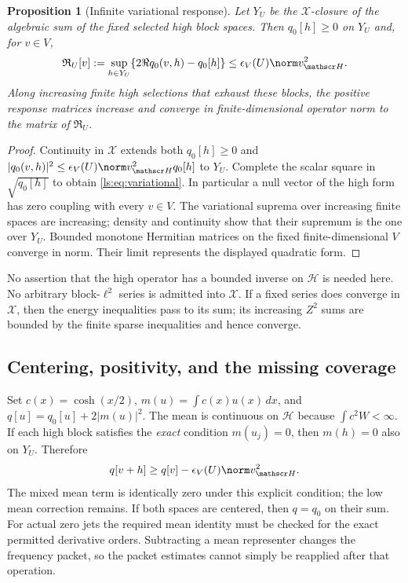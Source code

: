 \documentclass[11pt,a4paper]{article}
\numberwithin{equation}{section}
\newtheorem{proposition}[theorem]{Proposition}
\theoremstyle{definition}\newtheorem{definition}[theorem]{Definition}
\theoremstyle{remark}\newtheorem{remark}[theorem]{Remark}
\begin{document}
\begin{proposition}[Infinite variational response]\label{ls:prop:infinite}
Let $Y_U$ be the $\mathscr X$-closure of the algebraic sum of the fixed selected
high block spaces. Then $q_0[h]\ge0$ on $Y_U$ and, for $v\in V$,
\begin{equation}\label{ls:eq:variational}
 \mathfrak R_U[v]:=\sup_{h\in Y_U}
 \{2\Re q_0(v,h)-q_0[h]\}
 \le\epsilon_V(U)\norm v_{\mathscr H}^2.
\end{equation}
Along increasing finite high selections that exhaust these blocks, the
positive response matrices increase and converge in finite-dimensional
operator norm to the matrix of $\mathfrak R_U$.
\end{proposition}
\begin{proof}
Continuity in $\mathscr X$ extends both $q_0[h]\ge0$ and
$|q_0(v,h)|^2\le\epsilon_V(U)\norm v_{\mathscr H}^2q_0[h]$ to $Y_U$.
Complete the scalar square in $\sqrt{q_0[h]}$ to obtain
\eqref{ls:eq:variational}. In particular a null vector of the high form has
zero coupling with every $v\in V$. The variational suprema over increasing
finite spaces are increasing; density and continuity show that their
supremum is the one over $Y_U$. Bounded monotone Hermitian matrices on the
fixed finite-dimensional $V$ converge in norm. Their limit represents the
displayed quadratic form.
\end{proof}

No assertion that the high operator has a bounded inverse on $\mathscr H$ is
needed here. No arbitrary block-$\ell^2$ series is admitted into $\mathscr X$.
If a fixed series does converge in $\mathscr X$, then the energy inequalities
pass to its sum; its increasing $Z^2$ sums are bounded by the finite
sparse inequalities and hence converge.

\subsection{Centering, positivity, and the missing coverage}

Set $c(x)=\cosh(x/2)$, $m(u)=\int c(x)u(x)\,dx$, and
$q[u]=q_0[u]+2|m(u)|^2$. The mean is continuous on $\mathscr H$ because
$\int c^2W<\infty$. If each high block satisfies the \emph{exact}
condition $m(u_j)=0$, then $m(h)=0$ also on $Y_U$. Therefore
\begin{equation}\label{ls:eq:mean}
 q[v+h]\ge q[v]-\epsilon_V(U)\norm v_{\mathscr H}^2.
\end{equation}
The mixed mean term is identically zero under this explicit condition;
the low mean correction remains. If both spaces are centered, then
$q=q_0$ on their sum. For actual zero jets the required mean identity must
be checked for the exact permitted derivative orders. Subtracting a mean
representer changes the frequency packet, so the packet estimates cannot
simply be reapplied after that operation.
\end{document}
